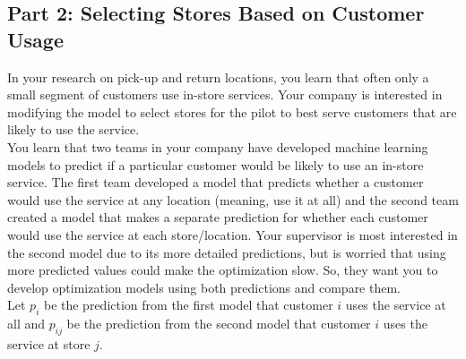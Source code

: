 \documentclass{article}
\begin{document}
\newpage

\subsection*{Part 2: Selecting Stores Based on Customer Usage}

In your research on pick-up and return locations, you learn that often only a small segment of customers use in-store services. Your company is interested in modifying the model to select stores for the pilot to best serve customers that are likely to use the service.\\

You learn that two teams in your company have developed machine learning models to predict if a particular customer would be likely to use an in-store service. The first team developed a model that predicts whether a customer would use the service at any location (meaning, use it at all) and the second team created a model that makes a separate prediction for whether each customer would use the service at each store/location. Your supervisor is most interested in the second model due to its more detailed predictions, but is worried that using more predicted values could make the optimization slow. So, they want you to develop optimization models using both predictions and compare them.\\

Let $p_i$ be the prediction from the first model that customer $i$ uses the service at all and $p_{ij}$ be the prediction from the second model that customer $i$ uses the service at store $j$.\\
\end{document}

